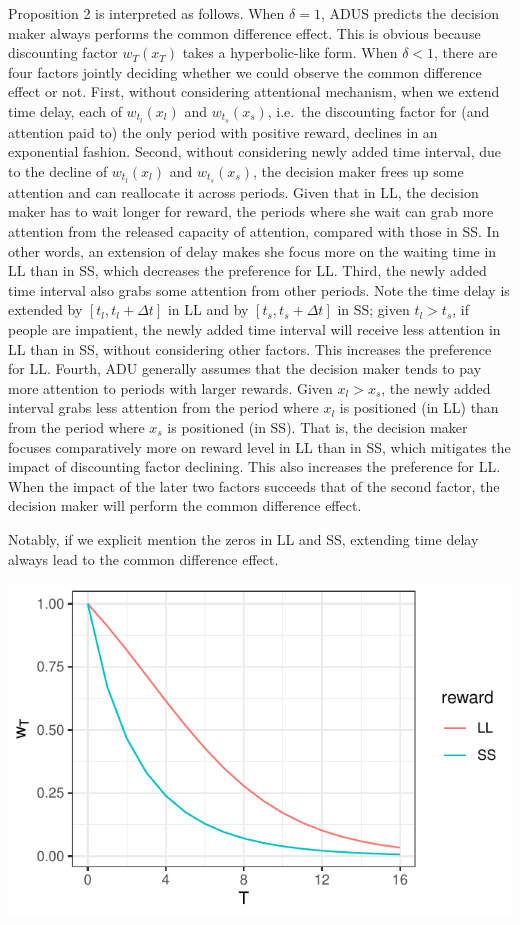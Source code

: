 \documentclass[
  12pt,
]{article}
\begin{document}
Proposition 2 is interpreted as follows. When \(\delta = 1\), ADUS
predicts the decision maker always performs the common difference
effect. This is obvious because discounting factor \(w_T(x_T)\) takes a
hyperbolic-like form. When \(\delta<1\), there are four factors jointly
deciding whether we could observe the common difference effect or not.
First, without considering attentional mechanism, when we extend time
delay, each of \(w_{t_l}(x_l)\) and \(w_{t_s}(x_s)\), i.e.~the
discounting factor for (and attention paid to) the only period with
positive reward, declines in an exponential fashion. Second, without
considering newly added time interval, due to the decline of
\(w_{t_l}(x_l)\) and \(w_{t_s}(x_s)\), the decision maker frees up some
attention and can reallocate it across periods. Given that in LL, the
decision maker has to wait longer for reward, the periods where she wait
can grab more attention from the released capacity of attention,
compared with those in SS. In other words, an extension of delay makes
she focus more on the waiting time in LL than in SS, which decreases the
preference for LL. Third, the newly added time interval also grabs some
attention from other periods. Note the time delay is extended by
\([t_l,t_l+\Delta t]\) in LL and by \([t_s, t_s+\Delta t]\) in SS; given
\(t_l>t_s\), if people are impatient, the newly added time interval will
receive less attention in LL than in SS, without considering other
factors. This increases the preference for LL. Fourth, ADU generally
assumes that the decision maker tends to pay more attention to periods
with larger rewards. Given \(x_l>x_s\), the newly added interval grabs
less attention from the period where \(x_l\) is positioned (in LL) than
from the period where \(x_s\) is positioned (in SS). That is, the
decision maker focuses comparatively more on reward level in LL than in
SS, which mitigates the impact of discounting factor declining. This
also increases the preference for LL. When the impact of the later two
factors succeeds that of the second factor, the decision maker will
perform the common difference effect.

Notably, if we explicit mention the zeros in LL and SS, extending time
delay always lead to the common difference effect.

\includegraphics{images/weight_LLvSS.pdf}
\end{document}
